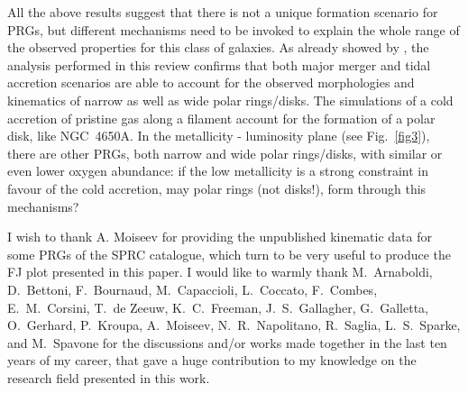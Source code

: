 \documentclass[11pt,twoside]{article}
\begin{document}
All the above results suggest that there is not a unique formation
scenario for PRGs, but different mechanisms need to be invoked to
explain the whole range of the observed properties for this class of
galaxies.  As already showed by \citet{Bou03}, the analysis performed
in this review confirms that both major merger and tidal accretion
scenarios are able to account for the observed morphologies and
kinematics of narrow as well as wide polar rings/disks.  The
simulations of a cold accretion of pristine gas along a filament
account for the formation of a polar disk, like NGC~4650A. In the
metallicity - luminosity plane (see Fig.~\ref{fig3}), there are other
PRGs, both narrow and wide polar rings/disks, with similar or even
lower oxygen abundance: if the low metallicity is a strong constraint
in favour of the cold accretion, may polar rings (not disks!), form
through this mechanisms?

\acknowledgements 
I wish to thank A. Moiseev for providing the unpublished kinematic
data for some PRGs of the SPRC catalogue, which turn to be very useful
to produce the FJ plot presented in this paper. I would like to warmly
thank M.~Arnaboldi, D.~Bettoni, F.~Bournaud, M.~Capaccioli,
L.~Coccato, F.~Combes, E.~M.~Corsini, T.~de Zeeuw, K.~C.~Freeman,
J.~S.~Gallagher, G.~Galletta, O.~Gerhard, P.~Kroupa, A.~Moiseev,
N.~R.~Napolitano, R.~Saglia, L.~S.~Sparke, and M.~Spavone for the
discussions and/or works made together in the last ten years of my
career, that gave a huge contribution to my knowledge on the research
field presented in this work.


%
\end{document}

